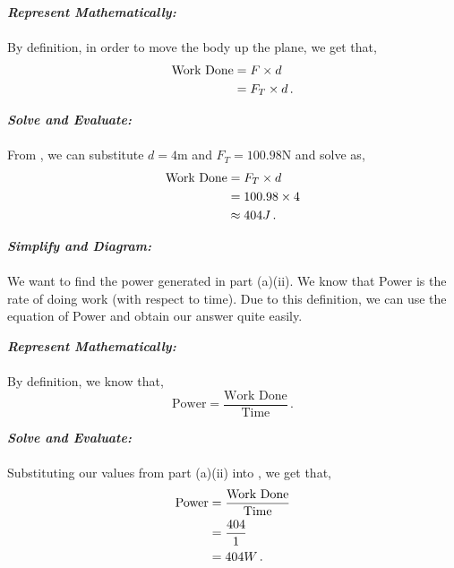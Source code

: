 \begin{subquestions}
\begin{subsubquestions}
\textbf{\textit{Represent Mathematically:}} \\ \\
By definition, in order to move the body up the plane, we get that,
\begin{align}
\text{Work Done} & = F \times d \nonumber \\
                 & = F_T \times d \,.	\label{2016:q6:EqnAii}
\end{align}




\textbf{\textit{Solve and Evaluate:}} \\ \\
From , we can substitute $d=4$m and $F_T=100.98$N and solve as,
\begin{align}
	\text{Work Done} & = F_T\times d \nonumber \\
	  & = 100.98\times 4 \nonumber \\
	  & \approx 404 J \,.
\end{align}


\subsubquestion
\textbf{\textit{Simplify and Diagram:}} \\ \\
We want to find the power generated in part (a)(ii). We know that Power is the rate of doing work (with respect to time). Due to this definition, we can use the equation of Power and obtain our answer quite easily.




\textbf{\textit{Represent Mathematically:}} \\ \\
By definition, we know that,
\begin{equation}
	\text{Power} = \frac{\text{Work Done}}{\text{Time}} \,. \label{2016:q6:EqnAiii}
\end{equation}




\textbf{\textit{Solve and Evaluate:}} \\ \\
Substituting our values from part (a)(ii) into , we get that,
\begin{align}
	\text{Power} & = \frac{\text{Work Done}}{\text{Time}} \nonumber \\
				 & = \frac{404}{1} \nonumber \\
				 & = 404 W \,.
\end{align}

\end{subsubquestions}


\end{subquestions}
